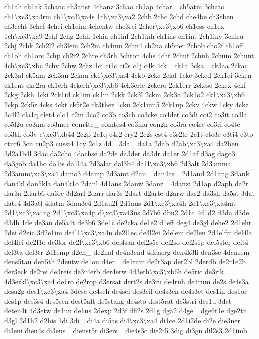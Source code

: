 {ch1ah ch1ak 5chanc ch3anst 4chanz 3chao ch1ap 4char\-\_\- ch5atm 3chato ch1\textbackslash{}xc3\textbackslash{}xa4rm ch1\textbackslash{}xc3\textbackslash{}xa4s 1ch\textbackslash{}xc3\textbackslash{}xa2 2chb 2chc 2chd che4be ch3eben ch3echt 3chef 4chei ch1eim 4chentw che3rei 2cher\textbackslash{}xc3\textbackslash{}xb6 ch1ess ch1ex 1ch\textbackslash{}xc3\textbackslash{}xa9 2chf 2chg 2chh 1chia ch1inf 2ch1inh ch1ins ch1int 2ch1inv 3chiru 2chj 2chk 2ch2l2 ch3lein 2ch2m ch4mu 2chn4 ch2na ch5ner 2chob cho2f ch1off ch1oh ch1orc 2chp ch2r2 2chre ch3rh 3chron 4chs 4cht 2chuf 2chuh 2chum 2chunt 4ch\textbackslash{}xc3\textbackslash{}xbc 2chv 2chw 2chz 1ci ci1c ci2s c1j c4k 4ck\-\_\- ck1a 3cka\-\_\- ck3aa 2ckac 2ck3al ck5am 2ck3an 2ckau ck1\textbackslash{}xc3\textbackslash{}xa4 4ckb 2ckc 2ckd 1cke 3cked 2ck1ei 3cken ck1ent cke2ra ck1erh 4ckerh\textbackslash{}xc3\textbackslash{}xb6 4ck3erle 2ckero 2ck1err 2ckese 2ckex 4ckf 2ckg 2ckh 1cki 2ck1id ck1im ck1in 2ckk 2ck3l 2ckm 2ck3n 2ck1o2 ck1\textbackslash{}xc3\textbackslash{}xb6 2ckp 2ck5r 4cks 4ckt ck5t2e ck3ther 1cku 2ck1um5 2ck1up 2ckv 4ckw 1cky 4ckz 3c4l2 cla1q clet4 clo1 c2m 3co2 co3b co3ch co3cke co4det co3di coi2 co3it co3la co5l2o co3ma co3mec com4te\-\_\- comtes4 co3mu con2n co3ra co4re co3ri co4te co3th co3v c\textbackslash{}xc3\textbackslash{}xb44 2c2p 2c1q c4r2 cry2 2c2s cst4 c3s2tr 2c1t cte3e c3ti4 c3to ctur6 3cu cu2p3 cussi4 1cy 2c1z 4d\-\_\- 3da\-\_\- da1a 2dab d2ab\textbackslash{}xc3\textbackslash{}xa4 da2ben 3d2a1b4l 3dac da2cho 4dachse da2de da3der da3dr da1er 2d1af d3ag dago3 da3gob da1ho da1is da1l4a 2d3alar dal3b4 da1l\textbackslash{}xc3\textbackslash{}xb6 2d3alt 2d3amma 2d3amm\textbackslash{}xc3\textbackslash{}xa4 damo3 d4amp 2d3amt d2an\-\_\- dan4ce\-\_\- 2d1and 2d1ang 3dank dan4kl dan5kla dan4k1o 2danl 4d1ans 2danw 3danz\-\_\- 4danzi 2d1ap d2aph da2r dar3a 2darb6 da3re 3d2arl 2darr dar3s 2dart d2arte d2arw das2 da3sh da5st 3dat date4 4d3atl 4datm 3dau3e4 2d1au2f 2d1aus 2d1\textbackslash{}xc3\textbackslash{}xa4h 2d1\textbackslash{}xc3\textbackslash{}xa4mt 2d1\textbackslash{}xc3\textbackslash{}xa4ng 2d1\textbackslash{}xc3\textbackslash{}xa4p d\textbackslash{}xc3\textbackslash{}xa43us 2d7b6 dbu2 2d1c 4d1d2 d3da d3de d3dh 1de de3an de5a4t de3b6 3de1c de2cka de1e2 d1eff deg4 de3gl dehe2 2d1ehr 2dei d2eic 3d2e1im de4l1\textbackslash{}xc3\textbackslash{}xa4n de2l1ec de3l2ei 2delem de2len 2d1elfm del4la del4lei de2l1o de3lor de2l\textbackslash{}xc3\textbackslash{}xb6 del4san del2s5e del2so del2s1p del5ster delt4 del3ta del3tr 2d1emp d2en\-\_\- de2nal de4n3end 4denerg den4k3li den3sc 4densem dens5tau den5th 2dentw de1on d4er\-\_\- de1ram de2r3ap der2bl 2derdb de2r1e2b der3eck de2rei de3reis de3r4erb der4erw 4d3erh\textbackslash{}xc3\textbackslash{}xb6h de5ric de3rik 4d3erkl\textbackslash{}xc3\textbackslash{}xa4 de1ro de2rop d3ersat dert2s de3ru de4ruh de4rum de2s de4s3a desa2g des1\textbackslash{}xc3\textbackslash{}xa4 3desc de4seh de4sei des3eil de4s3en de4s3et des1in des1or des1p des3s4 des5sen dest5alt de5stang de4sto dest5rat de3stri des1u 3det deten4t 4d3etw de1un de1us 2dexp 2d3f dfi2s 2d1g dga2 d4ge\-\_\- dge6t1e dge2tr d3gl 2d1h2 d2his 1di 3di\-\_\- di4a di5as di4\textbackslash{}xc3\textbackslash{}xa4 di1ce 2d1i2de di2e die3ner di3eni dien4s di3ens\-\_\- dienst5r di3ers\-\_\- die4s3c die2t5 3dig di3gn dil2s3 2d1imb }
